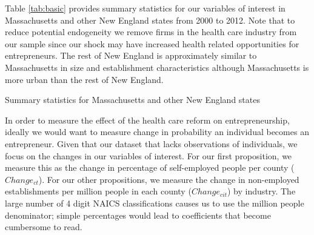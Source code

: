 \documentclass[12pt]{article}
\begin{document}
Table \ref{tab:basic} provides summary statistics for our variables of interest in Massachusetts and other New England states from 2000 to 2012. Note that to reduce potential endogeneity we remove firms in the health care industry from our sample since our shock may have increased health related opportunities for entrepreneurs. The rest of New England is approximately similar to Massachusetts in size and establishment characteristics although Massachusetts is more urban than the rest of New England. 

\begin{table}[H]
	\centering
	\caption{Summary statistics for Massachusetts and other New England states}
	
	\label{tab:basic}
\end{table}

In order to measure the effect of the health care reform on entrepreneurship, ideally we would want to measure change in probability an individual becomes an entrepreneur. Given that our dataset that lacks observations of individuals, we focus on the changes in our variables of interest. For our first proposition, we measure this as the change in percentage of self-employed people per county ($Change_{ct}$). For our other propositions, we measure the change in non-employed establishments per million people in each county ($Change_{cit}$) by industry. The large number of 4 digit NAICS classifications causes us to use the million people denominator; simple percentages would lead to coefficients that become cumbersome to read. 
\end{document}
